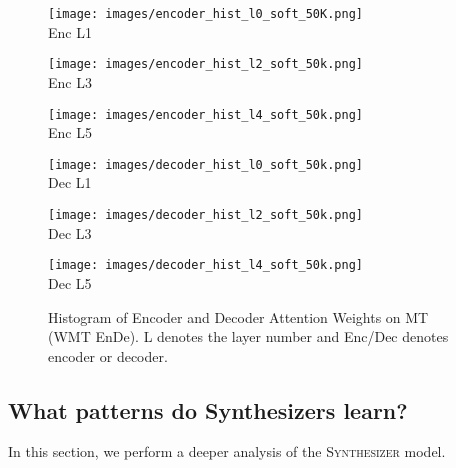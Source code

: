 \documentclass{article}
\begin{document}
\begin{figure}[H]
\begin{minipage}{0.32\linewidth}
  \centering
     \texttt{[image: images/encoder\_hist\_l0\_soft\_50K.png]}
    \\ {Enc L1}
    \label{fig:sortiter}
\end{minipage}\hfill
\begin{minipage}{0.32\linewidth}
  \centering
     \texttt{[image: images/encoder\_hist\_l2\_soft\_50k.png]}
    \\ {Enc L3}
    \label{fig:sortiter}
\end{minipage}\hfill
\begin{minipage}{0.32\linewidth}
  \centering
     \texttt{[image: images/encoder\_hist\_l4\_soft\_50k.png]}
    \\ {Enc L5}
    \label{fig:sortiter}
\end{minipage}\hfill 
\label{fig:hist1}
\begin{minipage}{0.32\linewidth}
  \centering
     \texttt{[image: images/decoder\_hist\_l0\_soft\_50k.png]}
    \\ {Dec L1}
    \label{fig:sortiter}
\end{minipage}\hfill 
\label{fig:analysis}
\begin{minipage}{0.32\linewidth}
  \centering
     \texttt{[image: images/decoder\_hist\_l2\_soft\_50k.png]}
    \\ {Dec L3}
    \label{fig:sortiter}
\end{minipage}\hfill 
\label{fig:analysis}
\begin{minipage}{0.32\linewidth}
  \centering
     \texttt{[image: images/decoder\_hist\_l4\_soft\_50k.png]}
    \\ {Dec L5}
    \label{fig:sortiter}
\end{minipage}\hfill 
\label{fig:hist2}
\caption{Histogram of Encoder and Decoder Attention Weights on MT (WMT EnDe). L denotes the layer number and Enc/Dec denotes encoder or decoder.}
\label{hist}
\end{figure}

\subsection{What patterns do Synthesizers learn?}
In this section, we perform a deeper analysis of the \textsc{Synthesizer} model.
\end{document}
